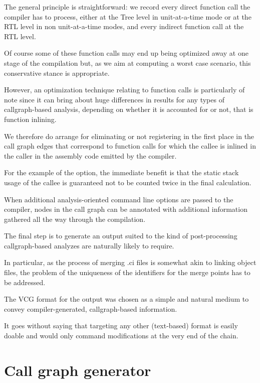 The general principle is straightforward: we record every direct function
call the compiler has to process, either at the Tree level in unit-at-a-time
mode or at the RTL level in non unit-at-a-time modes, and every indirect
function call at the RTL level.

Of course some of these function calls may end up being optimized away at one
stage of the compilation but, as we aim at computing a worst case scenario,
this conservative stance is appropriate.

However, an optimization technique relating to function calls is particularly
of note since it can bring about huge differences in results for any types of
callgraph-based analysis, depending on whether it is accounted for or not,
that is function inlining.

We therefore do arrange for eliminating or not registering in the first place
in the call graph edges that correspond to function calls for which the callee
is inlined in the caller in the assembly code emitted by the compiler.

For the example of the {\fsu} option, the immediate benefit is that the
static stack usage of the callee is guaranteed not to be counted twice
in the final calculation.

When additional analysis-oriented command line options are passed to the
compiler, nodes in the call graph can be annotated with additional
information gathered all the way through the compilation.

The final step is to generate an output suited to the kind of post-processing
callgraph-based analyzes are naturally likely to require.

In particular, as the process of merging .ci files is somewhat akin to linking
object files, the problem of the uniqueness of the identifiers for the merge
points has to be addressed.

The VCG format for the output was chosen as a simple and natural medium
to convey compiler-generated, callgraph-based information.

It goes without saying that targeting any other (text-based) format is easily
doable and would only command modifications at the very end of the chain.


\section{Call graph generator}


